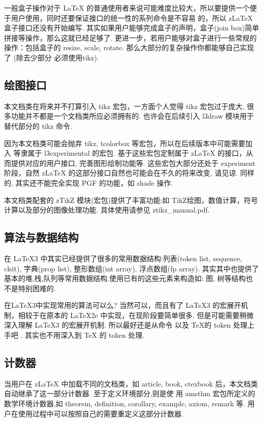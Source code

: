 一般盒子操作对于 \LaTeX{} 的普通使用者来说可能难度比较大，所以要提供一个便于用户使用，同时还要保证接口的统一性的系列命令是不容易
的，所以 z\LaTeX{} 盒子接口还没有开始编写. 其实如果用户能够完成盒子的声明，盒子(join box)简单拼接等操作，那么这就已经足够了.
更进一步，若用户能够对盒子进行一些常规的操作：包括盒子的 resize, scale, rotate. 那么大部分的复杂操作你都能够自己实现了 (除去少部分
必须使用tikz).


\subsection{绘图接口}
本文档类在将来并不打算引入 {tikz} 宏包，一方面个人觉得 tikz 宏包过于庞大, 很多功能并不都是一个文档类所应必须拥有的.
也许会在后续引入 {l3draw} 模块用于替代部分的 tikz 命令. 

因为本文档类可能会抛弃 {tikz, tcolorbox} 等宏包，所以在后续版本中可能需要加入 
等隶属于 l3experimental 的宏包. 基于这些宏包定制属于 z\LaTeX{} 的接口，从而提供对应的用户接口, 完善图形绘制功能等.
这些宏包大部分还处于 experiment 阶段，自然 z\LaTeX{} 的这部分接口自然也可能会在不久的将来改变, 请见谅. 同样的,
 其实还不能完全实现 PGF 的功能，如 shade 操作.

\begin{remark}
本文档类配套的 {zTikZ} 模块(宏包)提供了丰富功能:如 TikZ绘图，数值计算，符号计算以及部分的图像处理功能. 具体使用请参见
ztikz\_manual.pdf.
\end{remark}

\subsection{算法与数据结构}
在 \LaTeX{}3 中其实已经提供了很多的常用数据结构:列表(token list, sequence, clsit), 字典(prop list), 整形数组(int array), 
浮点数组(fp array). 其实其中也提供了基本的堆,栈,队列等常用数据结构.使用已有的这些元素来构造如: 图, 树等结构也不是特别困难的.

在\LaTeX3中实现常用的算法可以么? 当然可以，而且有了 \LaTeX3 的宏展开机制，相较于在原本的 \LaTeX 2e 中实现，在现阶段要简单很多.
但是可能需要稍微深入理解 \LaTeX3 的宏展开机制. 所以最好还是从命令 \cmd{\expandafter} 以及 \TeX 的 token 处理上手吧 \cmd{>_<}.
其实也不用深入到 \TeX{} 的 token 处理. 

\subsection{计数器}
当用户在 z\LaTeX{} 中加载不同的文档类，如 article, book, ctexbook 后，本文档类自动继承了这一部分计数器. 至于定义环境部分,则是使
用 {amsthm} 宏包所定义的数学环境计数器,如 theorem, definition, corollary, example, axiom, remark 等. 
用户在使用过程中可以按照自己的需要重定义这部分计数器.

